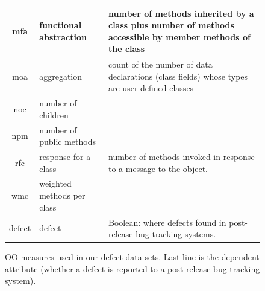 \documentclass[conference]{IEEEtran}
\begin{document}
\begin{figure}[htbp!]
\begin{center}
{\begin{tabular}{c|l|p{4.7in}}
        mfa & functional abstraction & number of methods inherited by a class
        plus number of methods accessible by member methods of the
        class\\\hline
        moa &  aggregation &  count of the number of data declarations (class
        fields) whose types are user defined classes\\\hline
        noc &  number of children &\\\hline
        npm & number of public methods & \\\hline
        rfc & response for a class &number of  methods invoked in response to
        a message to the object.\\\hline
        wmc & weighted methods per class &\\\hline
        \rowcolor{lightgray}
        defect & defect & Boolean: where defects found in post-release bug-tracking systems.
      \end{tabular}
    }
  \end{center}
  \caption{OO measures used in our defect data sets.  Last line is
    the dependent attribute (whether a defect is reported to  a
    post-release bug-tracking system).}\label{fig:ck}
\end{figure}
\end{document}
